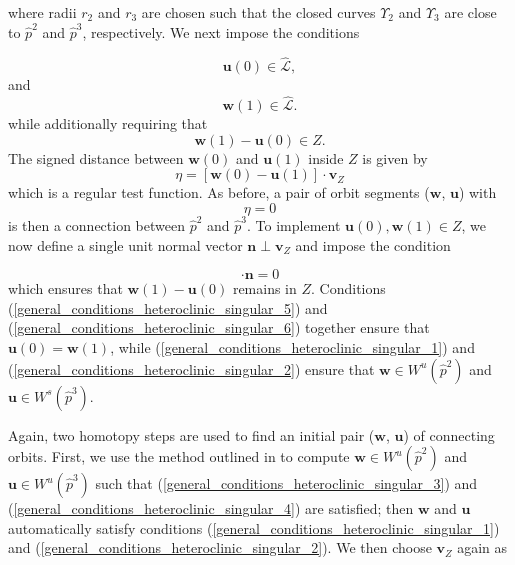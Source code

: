 \documentclass{ws-ijbc}
\begin{document}
where radii $r_2$ and $r_3$ are chosen such that the closed curves $\Upsilon_2$ and $\Upsilon_3$ are close to $\widehat{p}^2$ and $\widehat{p}^3$, respectively.  We next impose the conditions

\begin{equation}
	\mathbf{u}(0) \in \widehat{\mathscr{L}},
	\label{general_conditions_heteroclinic_singular_3}
\end{equation}
and
\begin{equation}
	\mathbf{w}(1) \in \widehat{\mathscr{L}}
	\label{general_conditions_heteroclinic_singular_4}.
\end{equation}
while additionally requiring that
	\begin{equation*}
		\mathbf{w}(1)-\mathbf{u}(0) \in Z.
	\end{equation*}
The signed distance between $\mathbf{w}(0)$ and $\mathbf{u}(1)$ inside $Z$ is given by
	\begin{equation}
		\eta = [ \mathbf{w}(0)-\mathbf{u}(1) ] \cdot \mathbf{v}_Z
		\label{general_conditions_heteroclinic_singular_5}
	\end{equation}
which is a regular test function.  As before, a pair of orbit segments ($\mathbf{w}$, $\mathbf{u}$) with 
	\begin{equation}
		\eta=0
		\label{general_conditions_heteroclinic_singular_6}
	\end{equation}
is then a connection between $\widehat{p}^2$ and $\widehat{p}^3$.  To implement $\mathbf{u}(0), \mathbf{w}(1) \in Z$, we now define a single unit normal vector $\mathbf{n} \perp \mathbf{v}_Z$ and impose the condition

	\begin{equation}
		[\mathbf{u}(0) - \mathbf{w}(1)] \cdot \mathbf{n} =0
		\label{general_conditions_heteroclinic_singular_7}
	\end{equation}
which ensures that $\mathbf{w}(1)-\mathbf{u}(0)$ remains in $Z$.  Conditions (\ref{general_conditions_heteroclinic_singular_5}) and (\ref{general_conditions_heteroclinic_singular_6}) together ensure that $\mathbf{u}(0)=\mathbf{w}(1)$, while (\ref{general_conditions_heteroclinic_singular_1}) and (\ref{general_conditions_heteroclinic_singular_2}) ensure that $\mathbf{w} \in W^u(\widehat{p}^2)$ and $\mathbf{u} \in W^s(\widehat{p}^3)$.

Again, two homotopy steps are used to find an initial pair ($\mathbf{w}$, $\mathbf{u}$) of connecting orbits.  First, we use the method outlined in \cite{Red_book} to compute $\mathbf{w} \in W^u(\widehat{p}^2)$ and $\mathbf{u} \in W^u(\widehat{p}^3)$ such that (\ref{general_conditions_heteroclinic_singular_3}) and (\ref{general_conditions_heteroclinic_singular_4}) are satisfied; then $\mathbf{w}$ and $\mathbf{u}$ automatically satisfy conditions (\ref{general_conditions_heteroclinic_singular_1}) and (\ref{general_conditions_heteroclinic_singular_2}).  We then choose $\mathbf{v}_Z$ again as
\end{document}
